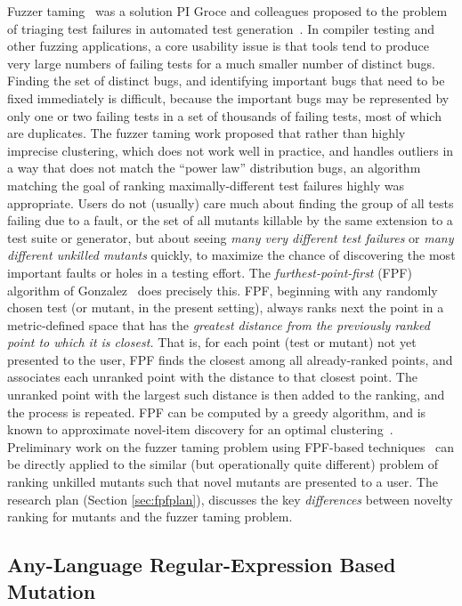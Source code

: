 Fuzzer taming~\cite{PLDI13} was a solution PI Groce and colleagues proposed to the problem
of triaging test failures in automated test generation~\cite{SemCrash}.  In compiler
testing and other fuzzing applications, a core usability issue is that
tools tend to produce very large numbers of failing tests for a much
smaller number of distinct bugs.  Finding the set of distinct bugs,
and identifying important bugs that need to be fixed immediately is
difficult, because the important bugs may be represented by only one
or two failing tests in a set of thousands of failing tests, most of
which are duplicates.  The fuzzer taming work proposed that rather than highly imprecise
clustering, which does not work well in practice, and handles outliers
in a way that does not match the ``power law'' distribution bugs, an
algorithm matching the goal of ranking maximally-different test
failures highly was appropriate.  Users do not (usually) care much
about finding the group of all tests failing due to a fault, or the
set of all mutants killable by the same extension to a test suite or
generator, but about seeing \emph{many very different test failures} or \emph{many
  different unkilled mutants} quickly, to maximize the chance of
discovering the most important faults or holes in a testing effort.
The \emph{furthest-point-first} (FPF) algorithm of
Gonzalez~\cite{Gonzalez85} does precisely this.  FPF, beginning with
any randomly chosen test (or mutant, in the present setting), always ranks
next the point in a metric-defined space that has the \emph{greatest
  distance from the previously ranked point to which it is closest.}
That is, for each point (test or mutant) not yet presented to the
user, FPF finds the closest among all already-ranked points, and
associates each unranked point with the distance to that closest
point.  The unranked point with the largest such distance is then
added to the ranking, and the process is repeated.  FPF can be
computed by a greedy algorithm, and is known to approximate novel-item
discovery for an optimal clustering~\cite{Gonzalez85}.  Preliminary work on the fuzzer taming problem using FPF-based
techniques~\cite{PLDI13,distMut} can be directly applied
to the similar (but operationally quite different) problem of ranking
unkilled mutants such that novel mutants are presented to a user.  The
research plan (Section
\ref{sec:fpfplan}), discusses the key \emph{differences} between novelty ranking
for mutants and
the fuzzer taming problem.

\subsection{Any-Language Regular-Expression Based Mutation}


